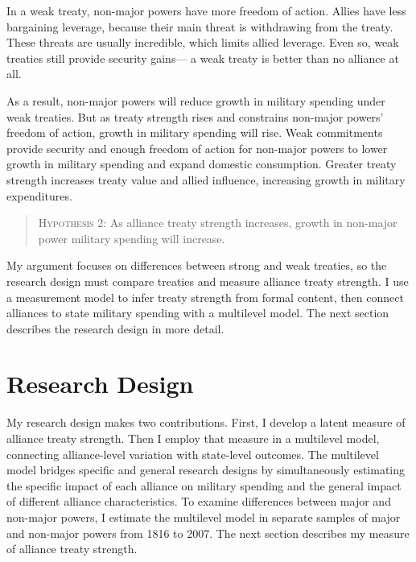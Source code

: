 \documentclass[12pt]{article}
\begin{document}
In a weak treaty, non-major powers have more freedom of action.  
Allies have less bargaining leverage, because their main threat is withdrawing from the treaty. 
These threats are usually incredible, which limits allied leverage. 
Even so, weak treaties still provide security gains--- a weak treaty is better than no alliance at all. 


As a result, non-major powers will reduce growth in military spending under weak treaties. 
But as treaty strength rises and constrains non-major powers' freedom of action, growth in military spending will rise. 
Weak commitments provide security and enough freedom of action for non-major powers to lower growth in military spending and expand domestic consumption. 
Greater treaty strength increases treaty value and allied influence, increasing growth in military expenditures. 


\begin{quote}
\textsc{Hypothesis 2}: As alliance treaty strength increases, growth in non-major power military spending will increase. 
\end{quote}


My argument focuses on differences between strong and weak treaties, so the research design must compare treaties and measure alliance treaty strength.  
I use a measurement model to infer treaty strength from formal content, then connect alliances to state military spending with a multilevel model. 
The next section describes the research design in more detail. 



\section{Research Design} 


My research design makes two contributions. 
First, I develop a latent measure of alliance treaty strength. 
Then I employ that measure in a multilevel model, connecting alliance-level variation with state-level outcomes. 
The multilevel model bridges specific and general research designs by simultaneously estimating the specific impact of each alliance on military spending and the general impact of different alliance characteristics. 
To examine differences between major and non-major powers, I estimate the multilevel model in separate samples of major and non-major powers from 1816 to 2007. 
The next section describes my measure of alliance treaty strength. 
\end{document}
